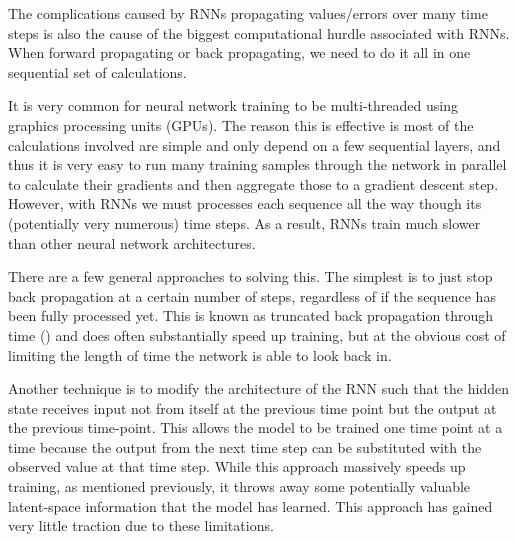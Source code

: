 \documentclass[]{book}
\theoremstyle{definition}
\theoremstyle{definition}
\theoremstyle{definition}
\theoremstyle{remark}
\begin{document}
The complications caused by RNNs propagating values/errors over many
time steps is also the cause of the biggest computational hurdle
associated with RNNs. When forward propagating or back propagating, we
need to do it all in one sequential set of calculations.

It is very common for neural network training to be multi-threaded using
graphics processing units (GPUs). The reason this is effective is most
of the calculations involved are simple and only depend on a few
sequential layers, and thus it is very easy to run many training samples
through the network in parallel to calculate their gradients and then
aggregate those to a gradient descent step. However, with RNNs we must
processes each sequence all the way though its (potentially very
numerous) time steps. As a result, RNNs train much slower than other
neural network architectures.

There are a few general approaches to solving this. The simplest is to
just stop back propagation at a certain number of steps, regardless of
if the sequence has been fully processed yet. This is known as truncated
back propagation through time (\citet{trunc_bptt}) and does often
substantially speed up training, but at the obvious cost of limiting the
length of time the network is able to look back in.

Another technique is to modify the architecture of the RNN such that the
hidden state receives input not from itself at the previous time point
but the output at the previous time-point. This allows the model to be
trained one time point at a time because the output from the next time
step can be substituted with the observed value at that time step. While
this approach massively speeds up training, as mentioned previously, it
throws away some potentially valuable latent-space information that the
model has learned. This approach has gained very little traction due to
these limitations.
\end{document}
